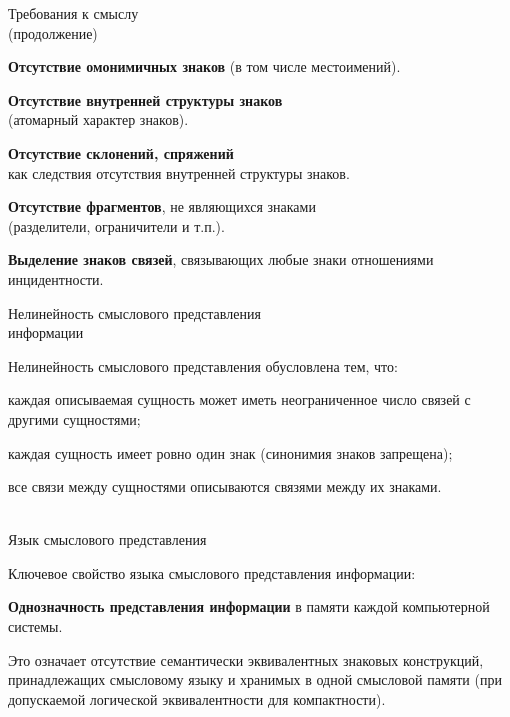 \begin{frame}{Требования к смыслу\\(продолжение)}
	\topline
	\justifying
	
	\begin{textitemize}
		\item \textbf{Отсутствие омонимичных знаков} (в том числе местоимений).
		\item \textbf{Отсутствие внутренней структуры знаков}\\
		(атомарный характер знаков).
		\item \textbf{Отсутствие склонений, спряжений}\\
		как следствия отсутствия внутренней структуры знаков.
		\item \textbf{Отсутствие фрагментов}, не являющихся знаками\\
		(разделители, ограничители и т.п.).
		\item \textbf{Выделение знаков связей}, связывающих любые знаки отношениями инцидентности.
	\end{textitemize}
	
\end{frame}


\begin{frame}{Нелинейность смыслового представления\\информации}
	\topline
	\justifying
	
	Нелинейность смыслового представления обусловлена тем, что:
	\begin{textitemize}
		\item каждая описываемая сущность может иметь неограниченное число связей с другими сущностями;
		\item каждая сущность имеет ровно один знак (синонимия знаков запрещена);
		\item все связи между сущностями описываются связями между их знаками.
	\end{textitemize}
	
\end{frame}


\begin{frame}{\\Язык смыслового представления}
	\topline
	\justifying
	
	Ключевое свойство языка смыслового представления информации:
	\begin{textitemize}
		\item \textbf{Однозначность представления информации} в памяти каждой компьютерной системы.
	\end{textitemize}
	
	\medskip
	Это означает отсутствие семантически эквивалентных знаковых конструкций, принадлежащих смысловому языку и хранимых в одной смысловой памяти (при допускаемой логической эквивалентности для компактности).
	
\end{frame}


